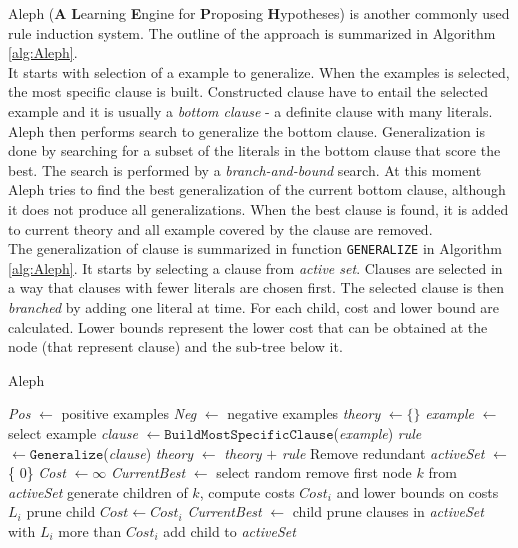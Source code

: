Aleph (\textbf{A} \textbf{L}earning \textbf{E}ngine for \textbf{P}roposing \textbf{H}ypotheses) is another commonly used rule induction system. The outline of the approach is summarized in Algorithm \ref{alg:Aleph}.  \\

It starts with selection of a example to generalize. When the examples is selected, the most specific clause is built. Constructed clause have to entail the selected example and it is usually a \textit{bottom clause} - a definite clause with many literals. \\

Aleph then performs search to generalize the bottom clause. Generalization is done by searching for a subset of the literals in the bottom clause that score the best. The search is performed by a \textit{branch-and-bound} search. At this moment Aleph tries to find the best generalization of the current bottom clause, although it does not produce all generalizations. When the best clause is found, it is added to current theory and all example covered by the clause are removed. \\

The generalization of clause is summarized in function \texttt{GENERALIZE} in Algorithm \ref{alg:Aleph}. It starts by selecting a clause from \textit{active set}. Clauses are selected in a way that clauses with fewer literals are chosen first. The selected clause is then \textit{branched} by adding one literal at time. For each child, cost and lower bound are calculated. Lower bounds represent the lower cost that can be obtained at the node (that represent clause) and the sub-tree below it. 

\begin{algorithm}
	\caption{Aleph}
	\label{alg:Aleph}
	\begin{algorithmic}[1]
			\State \textit{Pos} $\gets$ positive examples
			\State \textit{Neg} $\gets$ negative examples
			\State \textit{theory} $\gets \{ \}$
				\State \textit{example} $\gets$ select example
				\State \textit{clause} $\gets \mathtt{BuildMostSpecificClause}$(\textit{example}) 
				\State \textit{rule} $\gets \mathtt{Generalize}$(\textit{clause})
				\State \textit{theory} $\gets$ \textit{theory} $+$ \textit{rule}
				\State Remove redundant
			\EndWhile
		\EndFunction
		\Statex
			\State \textit{activeSet} $\gets$ \{ 0\}
			\State \textit{Cost} $\gets \infty $
			\State \textit{CurrentBest} $\gets$ select random
				\State remove first node $k$ from \textit{activeSet}
				\State generate children of $k$, compute costs $Cost_i$ and lower bounds on costs $L_i$
						\State prune child
					\Else						
							\State $Cost \gets Cost_i$
							\State \textit{CurrentBest} $\gets$ child
							\State prune clauses in \textit{activeSet} with $L_i$ more than $Cost_i$ 
						\EndIf
						\State add child to \textit{activeSet}
					\EndIf
				\EndFor
			\EndWhile 
		\EndFunction
	\end{algorithmic}
\end{algorithm}


